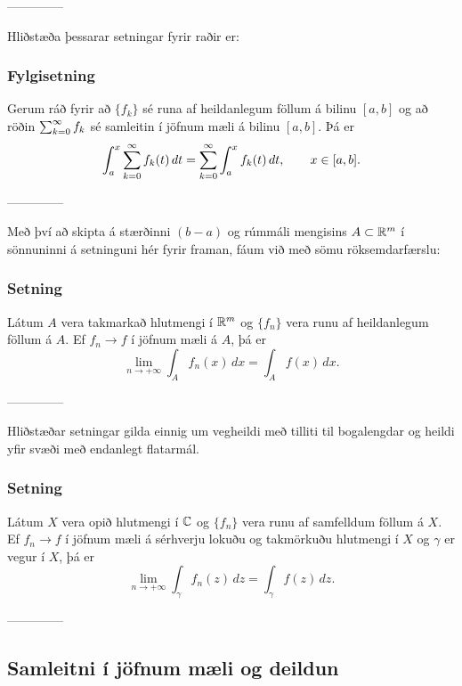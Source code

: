 --------------



\medskip
Hliðstæða þessarar setningar fyrir raðir er:


\subsubsection{Fylgisetning} 
Gerum ráð fyrir að   $\{f_k\}$ sé runa af heildanlegum föllum
 á bilinu $[a,b]$  og
að röðin  $\sum_{k=0}\sp \infty f_k$ sé samleitin
í jöfnum mæli á bilinu $[a,b]$.  Þá er
 $$\int_a\sp x \sum_{k=0}\sp \infty f_k(t)\, dt
= \sum_{k=0}\sp \infty \int_a\sp x  f_k(t)\, dt, \qquad x\in [a,b].
 $$


--------------




Með því að skipta á stærðinni $(b-a)$ og rúmmáli mengisins $A\subset
{\mathbb R}\sp m$ í sönnuninni á setninguni hér fyrir framan, fáum við með sömu
röksemdarfærslu: 

\subsubsection{Setning}  Látum $A$ vera takmarkað hlutmengi í
${\mathbb R}\sp m$ og $\{f_n\}$ vera runu af heildanlegum föllum á $A$.  Ef
$f_n\to f$ í jöfnum mæli á $A$, þá er 
 $$\lim\limits_{n\to +\infty} \int_A f_n(x)\, dx = \int_Af(x)\, dx.
 $$


--------------




Hliðstæðar setningar gilda einnig um vegheildi með tilliti til
bogalengdar og heildi yfir svæði með endanlegt flatarmál.

\subsubsection{Setning}  Látum $X$ vera opið hlutmengi í
${\mathbb C}$ og $\{f_n\}$ vera runu af samfelldum föllum á $X$.  Ef
$f_n\to f$ í jöfnum mæli á sérhverju lokuðu og takmörkuðu hlutmengi í 
$X$ og $\gamma$ er vegur í 
$X$,  þá er 
 $$\lim\limits_{n\to +\infty} \int_\gamma f_n(z)\, dz = 
\int_\gamma f(z)\, dz.
 $$


--------------





\subsection*{Samleitni í jöfnum mæli og deildun}

